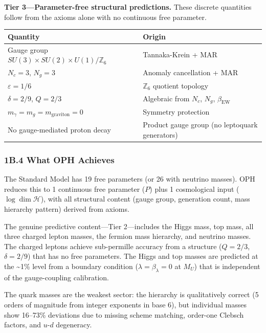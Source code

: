 \textbf{Tier 3---Parameter-free structural predictions.} These discrete quantities follow from the axioms alone with no continuous free parameter.

{\footnotesize
\begin{longtable}[]{@{}>{\RaggedRight\arraybackslash}p{}>{\RaggedRight\arraybackslash}p{}@{}}
\toprule
Quantity & Origin \\
\midrule
\endhead
\bottomrule
\endfoot
Gauge group \(SU(3) \times SU(2) \times U(1)/\mathbb{Z}_6\) & Tannaka-Krein + MAR \\
\(N_c = 3\), \(N_g = 3\) & Anomaly cancellation + MAR \\
\(\varepsilon = 1/6\) & \(\mathbb{Z}_6\) quotient topology \\
\(\delta = 2/9\), \(Q = 2/3\) & Algebraic from \(N_c\), \(N_g\), \(\beta_{\text{EW}}\) \\
\(m_\gamma = m_g = m_{\text{graviton}} = 0\) & Symmetry protection \\
No gauge-mediated proton decay & Product gauge group (no leptoquark generators) \\
\end{longtable}
}

\subsubsection{1B.4 What OPH Achieves}\label{1b4-what-oph-achieves}

The Standard Model has 19 free parameters (or 26 with neutrino masses). OPH reduces this to 1 continuous free parameter (\(P\)) plus 1 cosmological input (\(\log \dim \mathcal{H}\)), with all structural content (gauge group, generation count, mass hierarchy pattern) derived from axioms.

The genuine predictive content---Tier 2---includes the Higgs mass, top mass, all three charged lepton masses, the fermion mass hierarchy, and neutrino masses. The charged leptons achieve sub-permille accuracy from a structure (\(Q = 2/3\), \(\delta = 2/9\)) that has no free parameters. The Higgs and top masses are predicted at the \textasciitilde1\% level from a boundary condition (\(\lambda = \beta_\lambda = 0\) at \(M_U\)) that is independent of the gauge-coupling calibration.

The quark masses are the weakest sector: the hierarchy is qualitatively correct (5 orders of magnitude from integer exponents in base 6), but individual masses show 16--73\% deviations due to missing scheme matching, order-one Clebsch factors, and \(u\)-\(d\) degeneracy.

